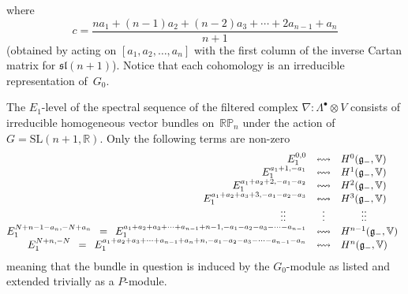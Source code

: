 where
\[c=\frac{na_1+(n-1)a_2+(n-2)a_3+\cdots+2a_{n-1}+a_n}{n+1}\]
(obtained by acting on $[a_1,a_2,\dots,a_n]$ with the f\/irst column of the
inverse Cartan matrix for ${\mathfrak{sl}}(n+1)$). Notice that each cohomology
is an irreducible representation of~$G_0$.

\begin{theorem}\label{E1level}
The $E_1$-level of the spectral sequence of the filtered complex
$\nabla:\Lambda^\bullet\otimes V$ consists of irreducible homogeneous vector
bundles on~${\mathbb{RP}}_n$ under the action of
$G={\mathrm{SL}}(n+1,{\mathbb{R}})$. Only the following terms are non-zero
\[\begin{array}{@{}rcl}
E_1^{0,0}&\leftrightsquigarrow&H^0({\mathfrak{g}}_-,{\mathbb{V}})\\
E_1^{a_1+1,-a_1}&\leftrightsquigarrow&H^1({\mathfrak{g}}_-,{\mathbb{V}})\\
E_1^{a_1+a_2+2,-a_1-a_2}&\leftrightsquigarrow&
H^2({\mathfrak{g}}_-,{\mathbb{V}})\\
E_1^{a_1+a_2+a_3+3,-a_1-a_2-a_3}&\leftrightsquigarrow&
H^3({\mathfrak{g}}_-,{\mathbb{V}})\\
\vdots\vdots\hspace*{20pt}&\vdots&\hspace*{20pt}\vdots\vdots\\
E_1^{N+n-1-a_n,-N+a_n}\enskip=\enskip
E_1^{a_1+a_2+a_3+\cdots+a_{n-1}+n-1,-a_1-a_2-a_3-\cdots-a_{n-1}}
&\leftrightsquigarrow&
H^{n-1}({\mathfrak{g}}_-,{\mathbb{V}})\\
E_1^{N+n,-N}\enskip=\enskip
E_1^{a_1+a_2+a_3+\cdots+a_{n-1}+a_n+n,-a_1-a_2-a_3-\cdots-a_{n-1}-a_n}
&\leftrightsquigarrow&
H^n({\mathfrak{g}}_-,{\mathbb{V}})
\end{array}\]
meaning that the bundle in question is induced by the $G_0$-module as listed
and extended trivially as a $P$-module.
\end{theorem}

